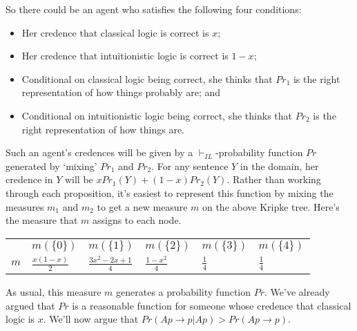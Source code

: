 \documentclass[
  11pt,
  letterpaper,
  DIV=11,
  numbers=noendperiod,
  oneside]{scrartcl}
\providecommand{\tightlist}{%
  \setlength{\itemsep}{0pt}\setlength{\parskip}{0pt}}\usepackage{longtable,booktabs,array}
\begin{document}
So there could be an agent who satisfies the following four conditions:

\begin{itemize}
\tightlist
\item
  Her credence that classical logic is correct is \(x\);
\item
  Her credence that intuitionistic logic is correct is \(1-x\);
\item
  Conditional on classical logic being correct, she thinks that \(Pr_1\)
  is the right representation of how things probably are; and
\item
  Conditional on intuitionistic logic being correct, she thinks that
  \(Pr_2\) is the right representation of how things are.
\end{itemize}

Such an agent's credences will be given by a \(\vdash_{IL}\)-probability
function \(Pr\) generated by `mixing' \(Pr_1\) and \(Pr_2\). For any
sentence \(Y\) in the domain, her credence in \(Y\) will be
\(xPr_1(Y) + (1-x)Pr_2(Y)\). Rather than working through each
proposition, it's easiest to represent this function by mixing the
measures \(m_1\) and \(m_2\) to get a new measure \(m\) on the above
Kripke tree. Here's the measure that \(m\) assigns to each node.

\begin{longtable}[]{@{}
  >{\raggedright\arraybackslash}p{}
  >{\centering\arraybackslash}p{}
  >{\centering\arraybackslash}p{}
  >{\centering\arraybackslash}p{}
  >{\centering\arraybackslash}p{}
  >{\centering\arraybackslash}p{}@{}}
\toprule\noalign{}
\endhead
\bottomrule\noalign{}
\endlastfoot
& \(m(\{0\})\) & \(m(\{1\})\) & \(m(\{2\})\) & \(m(\{3\})\) &
\(m(\{4\})\) \\
\(m\) & \(\frac{x(1-x)}{2}\) & \(\frac{3x^2 - 2x + 1}{4}\) &
\(\frac{1-x^2}{4}\) & \(\frac{1}{4}\) & \(\frac{1}{4}\) \\
\end{longtable}

As usual, this measure \(m\) generates a probability function \(Pr\).
We've already argued that \(Pr\) is a reasonable function for someone
whose credence that classical logic is \(x\). We'll now argue that
\(Pr(Ap \rightarrow p | Ap) > Pr(Ap \rightarrow p)\).
\end{document}
